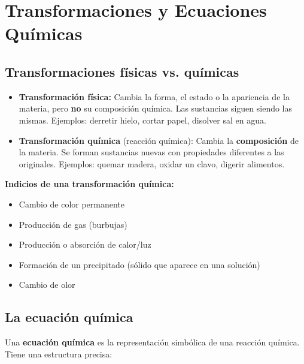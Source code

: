 \documentclass[12pt, letterpaper]{article}
\begin{document}
\newpage

\section{Transformaciones y Ecuaciones Químicas}

\subsection{Transformaciones físicas vs. químicas}

\begin{cuadroteoria}
  \begin{itemize}[leftmargin=*]
    \item \textbf{Transformación física:} Cambia la forma, el estado o la apariencia de la materia, pero \textbf{no} su composición química. Las sustancias siguen siendo las mismas. Ejemplos: derretir hielo, cortar papel, disolver sal en agua.

    \item \textbf{Transformación química} (reacción química): Cambia la \textbf{composición} de la materia. Se forman sustancias nuevas con propiedades diferentes a las originales. Ejemplos: quemar madera, oxidar un clavo, digerir alimentos.
  \end{itemize}
\end{cuadroteoria}

\begin{cuadrosolucion}
  \textbf{Indicios de una transformación química:}
  \begin{itemize}[leftmargin=*]
    \item Cambio de color permanente
    \item Producción de gas (burbujas)
    \item Producción o absorción de calor/luz
    \item Formación de un precipitado (sólido que aparece en una solución)
    \item Cambio de olor
  \end{itemize}
\end{cuadrosolucion}

\subsection{La ecuación química}

Una \textbf{ecuación química} es la representación simbólica de una reacción química. Tiene una estructura precisa:
\end{document}
